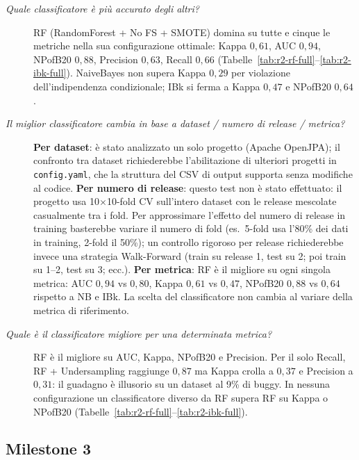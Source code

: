 \begin{description}
  \item[\textit{Quale classificatore è più accurato degli altri?}]
  RF (RandomForest + No FS + SMOTE) domina su tutte e cinque le metriche nella sua
  configurazione ottimale: Kappa $0{,}61$, AUC $0{,}94$, NPofB20 $0{,}88$, Precision
  $0{,}63$, Recall $0{,}66$ (Tabelle~\ref{tab:r2-rf-full}--\ref{tab:r2-ibk-full}).
  NaiveBayes non supera Kappa $0{,}29$ per violazione dell'indipendenza condizionale;
  IBk si ferma a Kappa $0{,}47$ e NPofB20 $0{,}64$.

  \item[\textit{Il miglior classificatore cambia in base a dataset / numero di release / metrica?}]
  \textbf{Per dataset}: è stato analizzato un solo progetto (Apache OpenJPA); il confronto
  tra dataset richiederebbe l'abilitazione di ulteriori progetti in \texttt{config.yaml},
  che la struttura del CSV di output supporta senza modifiche al codice.
  \textbf{Per numero di release}: questo test non è stato effettuato: il progetto usa
  10$\times$10-fold CV sull'intero dataset con le release mescolate casualmente tra i fold.
  Per approssimare l'effetto del numero di release in training basterebbe variare il numero
  di fold (es.\ 5-fold usa l'80\% dei dati in training, 2-fold il 50\%); un controllo
  rigoroso per release richiederebbe invece una strategia Walk-Forward (train su release
  1, test su 2; poi train su 1--2, test su 3; ecc.).
  \textbf{Per metrica}: RF è il migliore su ogni singola metrica: AUC $0{,}94$ vs
  $0{,}80$, Kappa $0{,}61$ vs $0{,}47$, NPofB20 $0{,}88$ vs $0{,}64$ rispetto a NB e IBk.
  La scelta del classificatore non cambia al variare della metrica di riferimento.

  \item[\textit{Quale è il classificatore migliore per una determinata metrica?}]
  RF è il migliore su AUC, Kappa, NPofB20 e Precision.
  Per il solo Recall, RF + Undersampling raggiunge $0{,}87$ ma Kappa crolla a $0{,}37$ e
  Precision a $0{,}31$: il guadagno è illusorio su un dataset al 9\% di buggy.
  In nessuna configurazione un classificatore diverso da RF supera RF su Kappa o NPofB20
  (Tabelle~\ref{tab:r2-rf-full}--\ref{tab:r2-ibk-full}).
\end{description}

\subsection{Milestone 3}

